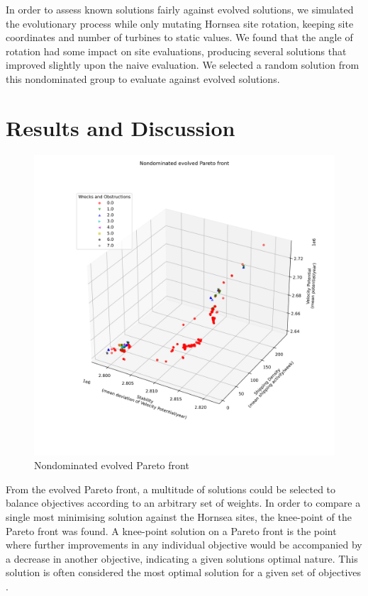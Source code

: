 \documentclass[preprint,12pt]{elsarticle}
\begin{document}
In order to assess known solutions fairly against evolved solutions, we simulated the evolutionary process while only mutating Hornsea site rotation, keeping site coordinates and number of turbines to static values. We found that the angle of rotation had some impact on site evaluations, producing several solutions that improved slightly upon the naive evaluation. We selected a random solution from this nondominated group to evaluate against evolved solutions.

\newpage
\section{Results and Discussion}
\begin{figure}[h!]
    \includegraphics[width=\textwidth,height=\textheight,keepaspectratio]{images/nondominated_evolved_pareto_front.png}
    \caption{Nondominated evolved Pareto front}
    \label{fig:nondominated_evolved_pareto_front}
\end{figure}

From the evolved Pareto front, a multitude of solutions could be selected to balance objectives according to an arbitrary set of weights. In order to compare a single most minimising solution against the Hornsea sites, the knee-point of the Pareto front was found. A knee-point solution on a Pareto front is the point where further improvements in any individual objective would be accompanied by a decrease in another objective, indicating a given solutions optimal nature. This solution is often considered the most optimal solution for a given set of objectives \cite{Maltese2016}.
\end{document}
